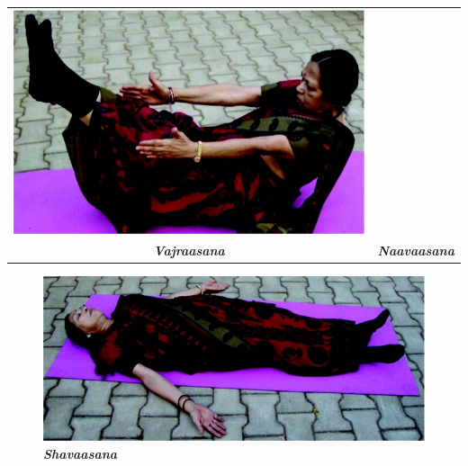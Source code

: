 \begin{center}
\begin{tabular}{@{}cc@{}}
\includegraphics[scale=1]{images/094.jpg}\\
{\textbf{\textit{Vajraasana}}} &
{\textbf{\textit{Naavaasana}}}\\
\end{tabular}
\end{center}

\clearpage

\begin{figure}[h]
\centering
\includegraphics[scale=1.8]{images/095.jpg}\\
\textbf{\textit{Shavaasana}}
\end{figure}



